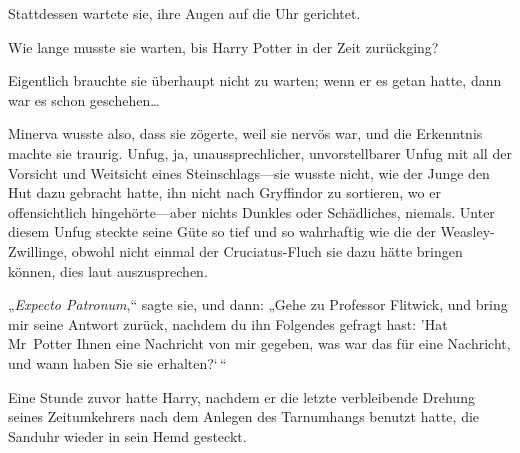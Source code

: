 Stattdessen wartete sie, ihre Augen auf die Uhr gerichtet.

Wie lange musste sie warten, bis Harry Potter in der Zeit zurückging?

Eigentlich brauchte sie überhaupt nicht zu warten; wenn er es getan hatte, dann war es schon geschehen…

Minerva wusste also, dass sie zögerte, weil sie nervös war, und die Erkenntnis machte sie traurig. Unfug, ja, unaussprechlicher, unvorstellbarer Unfug mit all der Vorsicht und Weitsicht eines Steinschlags—sie wusste nicht, wie der Junge den Hut dazu gebracht hatte, ihn nicht nach Gryffindor zu sortieren, wo er offensichtlich hingehörte—aber nichts Dunkles oder Schädliches, niemals. Unter diesem Unfug steckte seine Güte so tief und so wahrhaftig wie die der Weasley-Zwillinge, obwohl nicht einmal der Cruciatus-Fluch sie dazu hätte bringen können, dies laut auszusprechen.

„\emph{Expecto Patronum},“ sagte sie, und dann: „Gehe zu Professor Flitwick, und bring mir seine Antwort zurück, nachdem du ihn Folgendes gefragt hast: 'Hat Mr~Potter Ihnen eine Nachricht von mir gegeben, was war das für eine Nachricht, und wann haben Sie sie erhalten?`\,“

\later

Eine Stunde zuvor hatte Harry, nachdem er die letzte verbleibende Drehung seines Zeitumkehrers nach dem Anlegen des Tarnumhangs benutzt hatte, die Sanduhr wieder in sein Hemd gesteckt.

